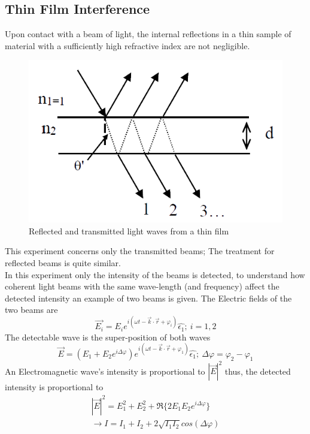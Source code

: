 \documentclass[reprint,amsmath,amssymb,aps, prl]{revtex4-2}
\begin{document}
\subsection{Thin Film Interference}
Upon contact with a beam of light, the internal reflections in a thin sample of material with a sufficiently high refractive index are not negligible.
\begin{figure}[h]
    \includegraphics[width=\linewidth]{Images/Thin film.png}
    \caption{Reflected and transmitted light waves from a thin film}
    \label{fig:ThinFilm}
\end{figure}
This experiment concerns only the transmitted beams; The treatment for reflected beams is quite similar.\\
In this experiment only the intensity of the beams is detected, to understand how coherent light beams with the same wave-length (and frequency) affect the detected intensity an example of two beams is given. 
The Electric fields of the two beams are
\begin{equation*}
    \vec{E_{i}}=E_{i}e^{i(\omega t - \vec{k}\cdot\vec{r} + \varphi_i)}\hat{\epsilon_1};\ i=1,2
\end{equation*}
The detectable wave is the super-position of both waves
\begin{equation*}
    \vec{E} = (E_{1}+E_{2}e^{i\Delta\varphi})e^{i(\omega t - \vec{k}\cdot\vec{r} + \varphi_1)}\hat{\epsilon_1};\ \Delta\varphi=\varphi_2-\varphi_1
\end{equation*}
An Electromagnetic wave's intensity is proportional to $|\vec{E}|^2$ thus, the detected intensity is proportional to 
\begin{equation*}
\begin{split}
    |\vec{E}|^2 = E_{1}^2 + E_2^2 + \Re\{2E_{1}E_{2}e^{i\Delta\varphi}\}\\ \rightarrow I=I_1+I_2+2\sqrt{I_1I_2}cos(\Delta\varphi)
\end{split}
\end{equation*}
\end{document}
